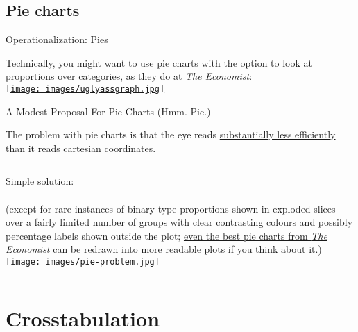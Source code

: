 \documentclass{beamer}
\begin{document}
	\subsection{Pie charts}

	\begin{frame}[t]{Operationalization: Pies}

		Technically, you might want to use pie charts with the  option to look at proportions over categories, as they  do at \textit{The Economist}:\\[1em]

		\href{http://andrewgelman.com/2011/04/attractive_but/}{\texttt{[image: images/uglyassgraph.jpg]}}

	\end{frame}
		
	
	\begin{frame}[t]{A Modest Proposal For Pie Charts (Hmm. Pie.)}

		The problem with pie charts is that the eye reads  \href{http://en.wikipedia.org/wiki/Pie_chart}{substantially less efficiently than it reads cartesian coordinates}.\\[1em]

		\begin{columns}[T]
			Simple solution:\\
			\\[4.75em]
			\tiny{(except for rare instances of binary-type proportions shown in exploded slices over a fairly limited number of groups with clear contrasting colours and possibly percentage labels shown outside the plot; \href{http://andrewgelman.com/2011/04/one_more_time-u/}{even the best pie charts from \textit{The Economist} can be redrawn into more readable plots} if you think about it.)}
			\texttt{[image: images/pie-problem.jpg]}
		\end{columns}

	\end{frame}
	
	
	
	
	\section{Crosstabulation}
\end{document}

